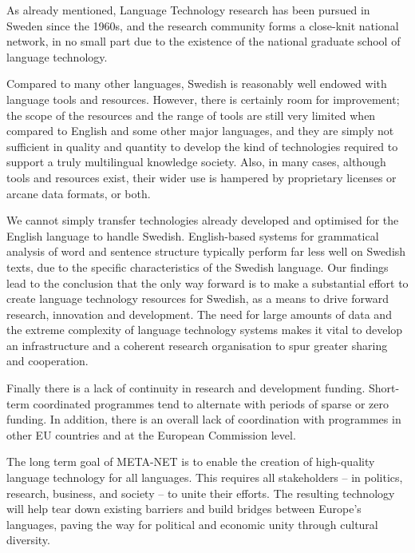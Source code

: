 \begin{multicols}{2}
As already mentioned, Language Technology research has been pursued in
Sweden since the 1960s, and the research community forms a close-knit
national network, in no small part due to the existence of the
national graduate school of language technology. 

Compared to many
other languages, Swedish is reasonably well endowed with language
tools and resources. However, there is certainly room for improvement;
the scope of the resources and the range of tools are still very
limited when compared to English and some other major languages, and
they are simply not sufficient in quality and quantity to develop the
kind of technologies required to support a truly multilingual
knowledge society. Also, in many cases, although tools and resources
exist, their wider use is hampered by proprietary licenses or arcane
data formats, or both. 

We cannot simply transfer technologies already developed and
optimised for the English language to handle Swedish. English-based
systems for grammatical analysis of word and sentence structure
typically perform far less well on Swedish texts, due to the specific
characteristics of the Swedish language. Our findings lead to the conclusion that the only way forward is to make a substantial effort to create language technology resources for Swedish, as a means to drive forward research, innovation and development. The need for large amounts of data and the extreme complexity of language technology systems makes it vital to develop an infrastructure and a coherent research organisation to spur greater sharing and cooperation.

Finally there is a lack of continuity in research and development funding. Short-term coordinated programmes tend to alternate with periods of sparse or zero funding. In addition, there is an overall lack of coordination with programmes in other EU countries and at the European Commission level.

The long term goal of META-NET is to enable the creation of
high-quality language technology for all languages. This requires all
stakeholders -- in politics, research, business, and society -- to
unite their efforts. The resulting technology will help tear down
existing barriers and build bridges between Europe’s languages, paving
the way for political and economic unity through cultural diversity.
\end{multicols}

\clearpage

